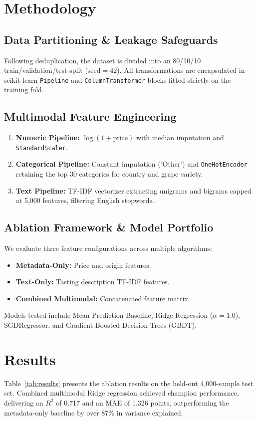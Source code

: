 \documentclass[conference]{IEEEtran}
\begin{document}
\section{Methodology}
\subsection{Data Partitioning & Leakage Safeguards}
Following deduplication, the dataset is divided into an 80/10/10 train/validation/test split ($\text{seed}=42$). All transformations are encapsulated in scikit-learn \texttt{Pipeline} and \texttt{ColumnTransformer} blocks fitted strictly on the training fold.

\subsection{Multimodal Feature Engineering}
\begin{enumerate}
\item \textbf{Numeric Pipeline:} $\log(1 + \text{price})$ with median imputation and \texttt{StandardScaler}.
\item \textbf{Categorical Pipeline:} Constant imputation ('Other') and \texttt{OneHotEncoder} retaining the top 30 categories for country and grape variety.
\item \textbf{Text Pipeline:} TF-IDF vectorizer extracting unigrams and bigrams capped at 5,000 features, filtering English stopwords.
\end{enumerate}

\subsection{Ablation Framework & Model Portfolio}
We evaluate three feature configurations across multiple algorithms:
\begin{itemize}
\item \textbf{Metadata-Only:} Price and origin features.
\item \textbf{Text-Only:} Tasting description TF-IDF features.
\item \textbf{Combined Multimodal:} Concatenated feature matrix.
\end{itemize}
Models tested include Mean-Prediction Baseline, Ridge Regression ($\alpha=1.0$), SGDRegressor, and Gradient Boosted Decision Trees (GBDT).

\section{Results}
Table~\ref{tab:results} presents the ablation results on the held-out 4,000-sample test set. Combined multimodal Ridge regression achieved champion performance, delivering an $R^2$ of 0.717 and an MAE of 1.326 points, outperforming the metadata-only baseline by over 87\% in variance explained.
\end{document}
